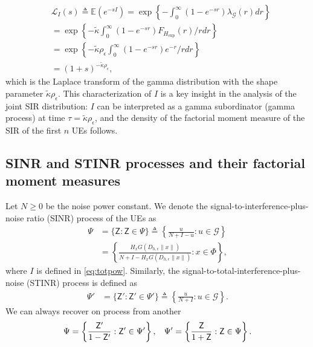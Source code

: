 \documentclass[lettersize,journal]{IEEEtran}
\begin{document}
\begin{align}
  \label{eq:lapdef}
  &\mathcal{L}_{I}(s)\triangleq \mathbb{E}\left(e^{-sI}\right)= \exp\left\{-\int_0^{\infty}(1-e^{-sr}) \lambda_{\mathcal{G}}(r) dr \right\} \nonumber \\
  &=\exp\left\{-\tilde{\kappa}\int_0^{\infty}(1-e^{-sr}) F_{{H}_{\text{exp}}}(r) /r dr \right\} \nonumber \\
  &=\exp\left\{-\tilde{\kappa}\rho_{\epsilon}\int_0^{\infty}(1-e^{-sr}) e^{-r} /r dr \right\} \nonumber \\
  &=(1+s)^{-\tilde{\kappa}\rho_{\epsilon}},
\end{align}
which is the Laplace transform of the gamma distribution with the shape parameter $\tilde{\kappa}\rho_{\epsilon}$. This characterization of $I$ is a key insight in the analysis of the joint SIR distribution: $I$ can be interpreted as a gamma subordinator (gamma process) at time $\tau=\tilde{\kappa} \rho_{\epsilon}$, and the density of the factorial moment measure of the SIR of the first $n$ UEs follows.


\subsection{SINR and STINR processes and their factorial moment measures}
Let $N \geq 0$ be the noise power constant. We denote the signal-to-interference-plus-noise ratio (SINR) process of the UEs as
\begin{align}
  \label{eq:STIR}
  \Psi &= \{\mathsf{Z}: \mathsf{Z} \in \Psi\} \triangleq \left\{ \frac{u}{N+I-u} : u \in \mathcal{G}\right\} \\
  &=\left\{ \frac{H_x G(D_{h,\epsilon}\|x\|)}{N+I-H_x G(D_{h,\epsilon}\|x\|)} : x \in \Phi\right\},
\end{align}
where $I$ is defined in \eqref{eq:totpow}. Similarly, the signal-to-total-interference-plus-noise (STINR) process is defined as
\begin{align}
  \label{eq:STNIR}
  \Psi' &= \{\mathsf{Z}': \mathsf{Z}' \in \Psi'\} \triangleq \left\{ \frac{u}{N+I} : u \in \mathcal{G}\right\}.
\end{align}
We can always recover on process from another
\begin{equation}
  \Psi = \left\{ \frac{\mathsf{Z}'}{1- \mathsf{Z}'}: \mathsf{Z}' \in \Psi' \right\}, \hspace{0.3cm} \Psi' = \left\{ \frac{\mathsf{Z}}{1+ \mathsf{Z}}: \mathsf{Z} \in \Psi \right\}.
\end{equation}
\end{document}
